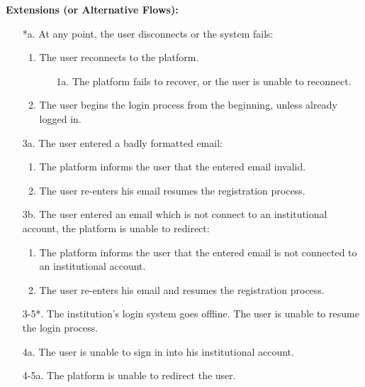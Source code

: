 \begin{itemize}[label={[\textbf{UC}]}, align=left, leftmargin=*]
    \textbf{Extensions (or Alternative Flows):} 
    \begin{enumerate}[label=\arabic*.]
        \item[*a.] At any point, the user disconnects or the system fails:
            \begin{enumerate}[label=\arabic*.]
                \item The user reconnects to the platform.
                    \begin{enumerate}[label=\alph*.]
                        \item[1a.] The platform fails to recover, or the user is unable to reconnect.
                    \end{enumerate}
                 \item The user begins the login process from the beginning, unless already logged in.
            \end{enumerate}
        \item[3a.] The user entered a badly formatted email:
            \begin{enumerate}[label=\arabic*.]
                \item The platform informs the user that the entered email invalid.
                \item The user re-enters his email resumes the registration process.
            \end{enumerate}
        \item[3b.] The user entered an email which is not connect to an institutional account, the platform is unable to redirect:
            \begin{enumerate}[label=\arabic*.]
                \item The platform informs the user that the entered email is not connected to an institutional account.
                \item The user re-enters his email and resumes the registration process.
            \end{enumerate}
        \item[3-5*.] The institution's login system goes offline. The user is unable to resume the login process.
        \item[4a.] The user is unable to sign in into his institutional account.
        \item[4-5a.] The platform is unable to redirect the user.
        \end{enumerate}


\end{itemize}
